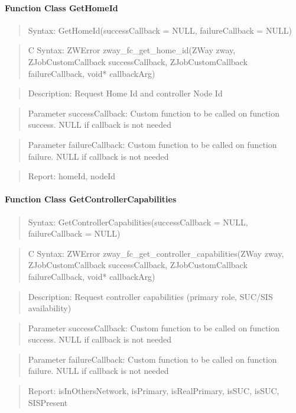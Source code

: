 \paragraph{Function Class GetHomeId}
\begin{quote}Syntax: GetHomeId(successCallback = NULL, failureCallback = NULL)\end{quote}
\begin{quote}C Syntax: ZWError zway\_fc\_get\_home\_id(ZWay zway, ZJobCustomCallback successCallback, ZJobCustomCallback failureCallback, void* callbackArg)\end{quote}
\begin{quote}Description: Request Home Id and controller Node Id\end{quote}
\begin{quote}Parameter successCallback: Custom function to be called on function success. NULL if callback is not needed\end{quote}
\begin{quote}Parameter failureCallback: Custom function to be called on function failure. NULL if callback is not needed\end{quote}
\begin{quote}Report: homeId, nodeId\end{quote}

\paragraph{Function Class GetControllerCapabilities}
\begin{quote}Syntax: GetControllerCapabilities(successCallback = NULL, failureCallback = NULL)\end{quote}
\begin{quote}C Syntax: ZWError zway\_fc\_get\_controller\_capabilities(ZWay zway, ZJobCustomCallback successCallback, ZJobCustomCallback failureCallback, void* callbackArg)\end{quote}
\begin{quote}Description: Request controller capabilities (primary role, SUC/SIS availability)\end{quote}
\begin{quote}Parameter successCallback: Custom function to be called on function success. NULL if callback is not needed\end{quote}
\begin{quote}Parameter failureCallback: Custom function to be called on function failure. NULL if callback is not needed\end{quote}
\begin{quote}Report: isInOthersNetwork, isPrimary, isRealPrimary, isSUC, isSUC, SISPresent\end{quote}

